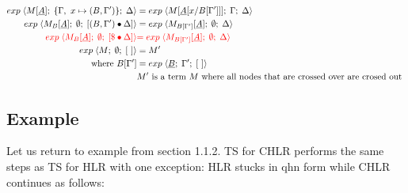 \documentclass[a4paper, 10pt]{article}
\begin{document}
\begin{align}
  \label{exp11} exp\; \langle M[\underline{A}];\; \{\Gamma,\ x \mapsto (B, \Gamma')\};\; \Delta \rangle
  &= exp\; \langle M[\underline{A}[x / B[\Gamma']]];\; \Gamma;\; \Delta \rangle \\
  \label{exp12} exp\; \langle M_B[\underline{A}];\; \emptyset;\; [(B,\Gamma')\bullet\Delta] \rangle
  &= exp\; \langle M_{B[\Gamma']}[\underline{A}];\; \emptyset;\; \Delta \rangle\\
  \label{exp13}  {\color{red} exp\; \langle M_B[\underline{A}];\; \emptyset;\;  [\$ \bullet \Delta] \rangle}
  &{\color{red}= exp\; \langle M_{B[\Gamma']}[\underline{A}];\; \emptyset;\; \Delta \rangle } \\
  \label{exp14} exp\; \langle M;\; \emptyset;\; [\ ] \rangle &= M' \\
  \textnormal{where } B[\Gamma'] &= exp\; \langle \underline{B};\; \Gamma';\; [\ ] \rangle \\
  & M' \textnormal{ is a term } M \textnormal{ where all nodes that are crossed over are crosed out }
\end{align}


\subsection{Example}
Let us return to example from section 1.1.2. TS for CHLR performs the same steps as TS for HLR
with one exception: HLR stucks in qhn form while CHLR continues as follows:
\end{document}
